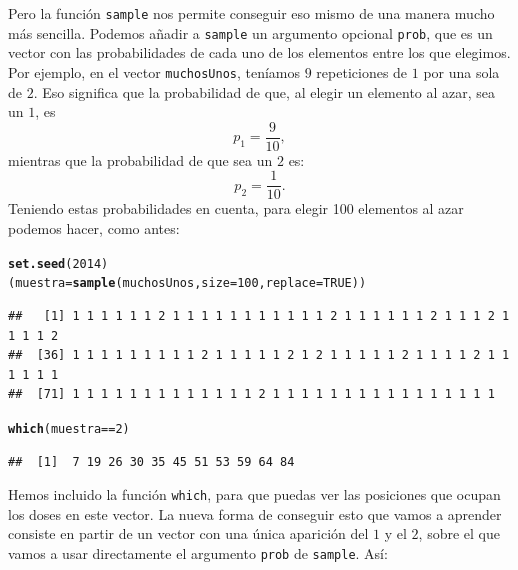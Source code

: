 \documentclass[10pt,a4paper]{article}\usepackage[]{graphicx}\usepackage[]{color}
\makeatletter
\newcommand{\hlnum}[1]{\textcolor[rgb]{0.686,0.059,0.569}{#1}}%
\newcommand{\hlopt}[1]{\textcolor[rgb]{0,0,0}{#1}}%
\newcommand{\hlstd}[1]{\textcolor[rgb]{0.345,0.345,0.345}{#1}}%
\newcommand{\hlkwb}[1]{\textcolor[rgb]{0.69,0.353,0.396}{#1}}%
\newcommand{\hlkwc}[1]{\textcolor[rgb]{0.333,0.667,0.333}{#1}}%
\newcommand{\hlkwd}[1]{\textcolor[rgb]{0.737,0.353,0.396}{\textbf{#1}}}%
\newenvironment{kframe}{%
 \def\at@end@of@kframe{}%
 \ifinner\ifhmode%
  \def\at@end@of@kframe{\end{minipage}}%
  \begin{minipage}{\columnwidth}%
 \fi\fi%
 \def\FrameCommand##1{\hskip\@totalleftmargin \hskip-\fboxsep
 \colorbox{shadecolor}{##1}\hskip-\fboxsep
     \hskip-\linewidth \hskip-\@totalleftmargin \hskip\columnwidth}%
 \MakeFramed {\advance\hsize-\width
   \@totalleftmargin\z@ \linewidth\hsize
   \@setminipage}}%
 {\par\unskip\endMakeFramed%
 \at@end@of@kframe}
\newenvironment{knitrout}{}{} %
\makeatother
\begin{document}
Pero la función {\tt sample} nos permite conseguir eso mismo de una manera mucho más sencilla. Podemos añadir a {\tt sample} un argumento opcional {\tt prob}, que es un vector con las probabilidades de cada uno de los elementos entre los que elegimos. Por ejemplo, en el vector {\tt muchosUnos}, teníamos $9$ repeticiones de $1$ por una sola de $2$. Eso significa que la probabilidad de que, al elegir un elemento al azar, sea un $1$, es
\[p_1=\dfrac{9}{10},\]
mientras que la probabilidad de que sea un $2$ es:
\[p_2=\dfrac{1}{10}.\]
Teniendo estas probabilidades en cuenta, para elegir 100 elementos al azar podemos hacer, como antes:
\begin{knitrout}
\color{fgcolor}\begin{kframe}
\begin{alltt}
\hlkwd{set.seed}\hlstd{(}\hlnum{2014}\hlstd{)}
\hlstd{(muestra} \hlkwb{=} \hlkwd{sample}\hlstd{(muchosUnos,} \hlkwc{size}\hlstd{=}\hlnum{100}\hlstd{,} \hlkwc{replace}\hlstd{=}\hlnum{TRUE}\hlstd{) )}
\end{alltt}
\begin{verbatim}
##   [1] 1 1 1 1 1 1 2 1 1 1 1 1 1 1 1 1 1 1 2 1 1 1 1 1 1 2 1 1 1 2 1 1 1 1 2
##  [36] 1 1 1 1 1 1 1 1 1 2 1 1 1 1 1 2 1 2 1 1 1 1 1 2 1 1 1 1 2 1 1 1 1 1 1
##  [71] 1 1 1 1 1 1 1 1 1 1 1 1 1 2 1 1 1 1 1 1 1 1 1 1 1 1 1 1 1 1
\end{verbatim}
\begin{alltt}
\hlkwd{which}\hlstd{(muestra}\hlopt{==}\hlnum{2}\hlstd{)}
\end{alltt}
\begin{verbatim}
##  [1]  7 19 26 30 35 45 51 53 59 64 84
\end{verbatim}
\end{kframe}
\end{knitrout}
Hemos incluido la función {\tt which}, para que puedas ver las posiciones que ocupan los doses en este vector. La nueva forma de conseguir esto que vamos a aprender consiste en partir de un vector con una única aparición del $1$ y el $2$, sobre el que vamos a usar directamente el argumento {\tt prob} de {\tt sample}. Así:
\end{document}
